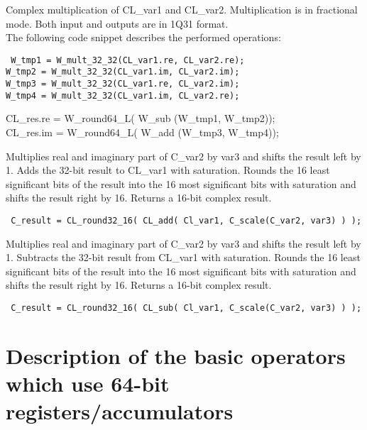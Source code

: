 
Complex multiplication of CL\_var1 and CL\_var2.
Multiplication is in fractional mode. Both input and outputs are in 1Q31 format.\\
The following code snippet describes the performed operations:

{\tt {} W\_tmp1 = W\_mult\_32\_32(CL\_var1.re, CL\_var2.re);\\
 W\_tmp2 = W\_mult\_32\_32(CL\_var1.im, CL\_var2.im);\\
 W\_tmp3 = W\_mult\_32\_32(CL\_var1.re, CL\_var2.im);\\
 W\_tmp4 = W\_mult\_32\_32(CL\_var1.im, CL\_var2.re);

 CL\_res.re = W\_round64\_L( W\_sub (W\_tmp1, W\_tmp2));\\
 CL\_res.im = W\_round64\_L( W\_add (W\_tmp3, W\_tmp4));
}


Multiplies real and imaginary part of C\_var2 by var3 and shifts the result left by 1.
Adds the 32-bit result to CL\_var1 with saturation.
Rounds the 16 least significant bits of the result into the 16 most significant bits with saturation and shifts the result right by 16.
Returns a 16-bit complex result.

{\tt {} C\_result = CL\_round32\_16( CL\_add( Cl\_var1, C\_scale(C\_var2, var3) ) ); }


Multiplies real and imaginary part of C\_var2 by var3 and shifts the result left by 1.
Subtracts the 32-bit result from CL\_var1 with saturation. Rounds the 16 least significant bits of the result into the 16 most significant bits with saturation and shifts the result right by 16.
Returns a 16-bit complex result.

{\tt {} C\_result = CL\_round32\_16( CL\_sub( Cl\_var1, C\_scale(C\_var2, var3) ) ); }


\section{Description of the basic operators which use 64-bit registers/accumulators} \label{basop64bitoperators}

